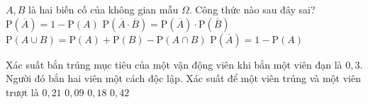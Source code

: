 \begin{ex}%
	$A,B$ là hai biến cố của không gian mẫu $\Omega$. Công thức nào sau đây sai?
	\choice
	{$\mathrm{P}\left(\overline{A}\right)=1-\mathrm{P}(A)$} 
	{\True $\mathrm{P}\left(\overline{A}\cdot\overline{B}\right)=\mathrm{P}\left(\overline{A}\right)\cdot \mathrm{P}\left(\overline{B}\right)$}
	{$\mathrm{P}\left(A\cup B\right)=\mathrm{P}(A)+\mathrm{P}(B)-\mathrm{P}\left(A\cap B\right)$}
	{$\mathrm{P}\left(\overline{A}\right)=1-\mathrm{P}(A)$}
\end{ex}
\begin{ex}%
	Xác suất bắn trúng mục tiêu của một vận động viên khi bắn một viên đạn là $0{,}3$. Người đó bắn hai viên một cách độc lập. Xác suất để một viên trúng và một viên trượt là
	\choice
	{\True $0{,}21$} 
	{$0{,}09$}
	{$0{,}18$}
	{$0{,}42$}
\end{ex}
